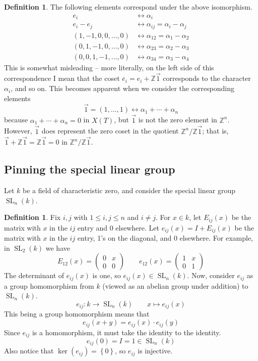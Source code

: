 \documentclass[12pt]{article}
\theoremstyle{definition}
\newtheorem{definition}[theorem]{Definition}
\numberwithin{theorem}{subsection}
\newcommand{\Z}{\mathbb{Z}}
\newcommand{\lp}{\left(}
\newcommand{\rp}{\right)}
\newcommand{\lb}{\left\{}
\newcommand{\rb}{\right\}}
\newcommand{\noi}{\noindent}
\newcommand{\ov}{\overline}
\DeclareMathOperator{\SL}{SL}
\begin{document}
\begin{definition}
\noi The following elements correspond under the above isomorphism.
\begin{align*}
	e_i &\longleftrightarrow \alpha_i \\
	e_i - e_j &\longleftrightarrow \alpha_{ij} = \alpha_i - \alpha_j \\
	(1, -1, 0, 0, \ldots, 0) &\longleftrightarrow \alpha_{12} = \alpha_1 - \alpha_2 \\
	(0, 1, -1, 0, \ldots, 0) &\longleftrightarrow \alpha_{23} = \alpha_2 - \alpha_3 \\
	(0, 0, 1, -1, \ldots, 0) &\longleftrightarrow \alpha_{34} = \alpha_3 - \alpha_4
\end{align*}
This is somewhat misleading -- more literally, on the left side of this correspondence I mean that the coset $\ov e_i = e_i + \Z \vec 1$ corresponds to the character $\alpha_i$, and so on. This becomes apparent when we consider the corresponding elements
\[
	\vec 1 = (1, \ldots, 1) \longleftrightarrow \alpha_1 + \cdots + \alpha_n
\]
because $\alpha_1 + \cdots + \alpha_n = 0$ in $X(T)$, but $\vec 1$ is not the zero element in $\Z^n$. However, $\vec 1$ does represent the zero coset in the quotient $\Z^n / \Z \vec 1$; that is, $\vec 1 + \Z \vec 1 = \Z \vec 1 = 0$ in $\Z^n / \Z \vec 1$.

\subsection{Pinning the special linear group}

Let $k$ be a field of characteristic zero, and consider the special linear group $\SL_n(k)$.

\begin{definition}
Fix $i, j$ with $1 \le i, j \le n$ and $i \neq j$. For $x \in k$, let $E_{ij}(x)$ be the matrix with $x$ in the $ij$ entry and 0 elsewhere. Let $e_{ij}(x) = I + E_{ij}(x)$ be the matrix with $x$ in the $ij$ entry, 1's on the diagonal, and 0 elsewhere. For example, in $\SL_2(k)$ we have
\[
	E_{12}(x) =
	\begin{pmatrix}
		0 & x \\
		0 & 0
	\end{pmatrix}
	\qquad
	e_{12}(x) =
	\begin{pmatrix}
		1 & x \\
		0 & 1
	\end{pmatrix}
\]
The determinant of $e_{ij}(x)$ is one, so $e_{ij}(x) \in \SL_n(k)$. Now, consider $e_{ij}$ as a group homomorphism from $k$ (viewed as an abelian group under addition) to $\SL_n(k)$.
\[
	e_{ij}:k \to \SL_n(k) \qquad x \mapsto e_{ij}(x)
\]
This being a group homomorphism means that
\[
	e_{ij}(x+y) = e_{ij}(x) \cdot e_{ij}(y)
\]
Since $e_{ij}$ is a homomorphism, it must take the identity to the identity.
\[
	e_{ij}(0) = I =1 \in \SL_n(k)
\]
Also notice that $\ker \lp e_{ij} \rp = \lb 0 \rb$, so $e_{ij}$ is injective. 
\end{definition}


\end{definition}
\end{document}
